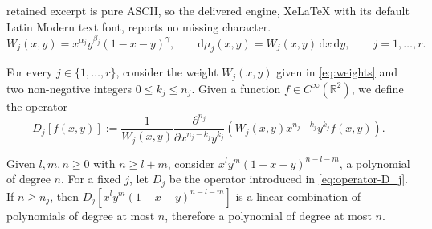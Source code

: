 \documentclass[10pt,a4paper]{amsart}
\newcommand{\dr}{\mathrm{d}}
\begin{document}
retained excerpt is pure ASCII, so the delivered engine, XeLaTeX with its default Latin Modern text font, reports no missing character.
\begin{equation}
    \label{eq:weights}
    W_j(x,y) = x^{\alpha_j}y^{\beta_j}(1-x-y)^{\gamma}, \qquad \dr\mu_j(x,y)=W_j(x,y)\,\dr x\,\dr y, \qquad j=1,\dots,r.
\end{equation}

\begin{definition}
    For every $j\in\{1,\dots,r\}$, consider the weight $W_j(x,y)$ given in \eqref{eq:weights} and two non-negative integers $0\leq k_j\leq n_j$. Given a function $f\in C^\infty(\mathbb R^2)$, we define the operator
    \begin{equation}
    \label{eq:operator-D_j}
        D_{j}[f(x,y)]:=\dfrac{1}{W_j(x,y)}\dfrac{\partial^{n_j}}{\partial x^{n_j-k_j}y^{k_j}}\left(W_j(x,y) x^{n_j-k_j} y^{k_j} f(x,y)\right).
    \end{equation}
\end{definition}

\begin{lemma}
    \label{lemma:operator-degree}
    Given $l,m,n\geq0$ with $n\geq l+m$, consider $x^l y^m (1-x-y)^{n-l-m}$, a polynomial of degree $n$. For a fixed $j$, let $D_j$ be the operator introduced in \eqref{eq:operator-D_j}. If $n\ge n_j$, then $D_j[x^l y^m (1-x-y)^{n-l-m}]$ is a linear combination of polynomials of degree at most $n$, therefore a polynomial of degree at most $n$.
\end{lemma}
\end{document}
